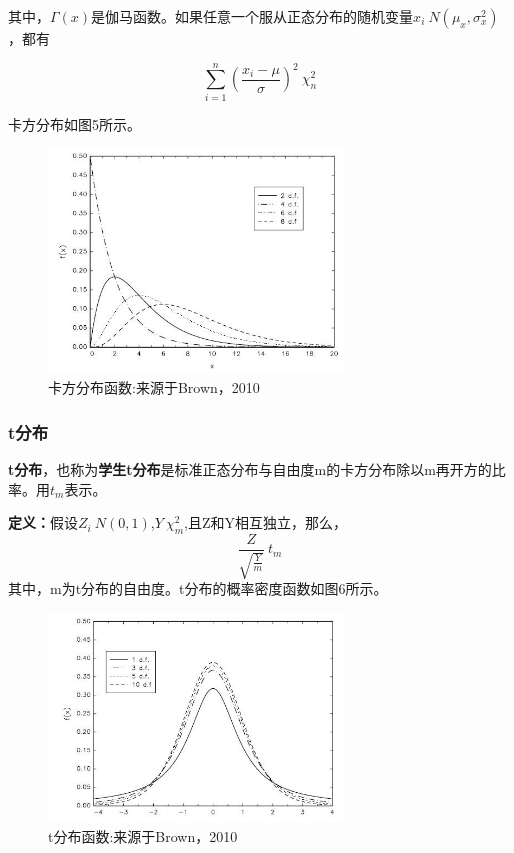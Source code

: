 \documentclass[cn,12pt,math=newtx,citestyle=gb7714-2015,bibstyle=gb7714-2015]{elegantbook}
\begin{document}
	其中，$\Gamma(x)$是伽马函数。如果任意一个服从正态分布的随机变量$x_i~N(\mu_x,\sigma_x^2)$，都有
	
	\begin{equation}
		\sum_{i=1}^n{(\frac{x_i-\mu}{\sigma})^2}~\chi_n^2
	\end{equation}
	
	卡方分布如图5所示。
		\begin{figure}[htbp]
		\centering
		\includegraphics[width=0.7\textwidth]{chi.jpg}
		\caption{卡方分布函数:来源于Brown，2010}\label{fig:digit}
	\end{figure}
	

	
	\subsubsection{t分布}
	\textbf{t分布}，也称为\textbf{学生t分布}是标准正态分布与自由度m的卡方分布除以m再开方的比率。用$t_m$表示。
	
	\textbf{定义：}假设$Z_i~N(0,1)$,$Y~\chi_m^2$,且Z和Y相互独立，那么，
	\begin{equation}
		\frac{Z}{\sqrt{\frac{Y}{m}}}~t_m
	\end{equation}
	其中，m为t分布的自由度。t分布的概率密度函数如图6所示。
		\begin{figure}[htbp]
		\centering
		\includegraphics[width=0.7\textwidth]{t.jpg}
		\caption{t分布函数:来源于Brown，2010}\label{fig:digit}
	\end{figure}
	
\end{document}
